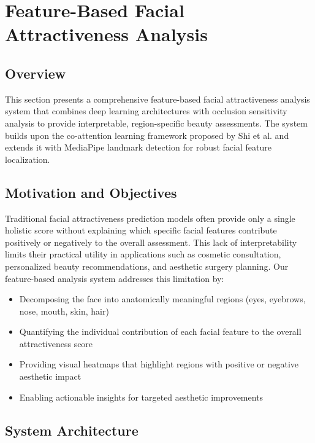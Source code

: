 \section{Feature-Based Facial Attractiveness Analysis}

\subsection{Overview}

This section presents a comprehensive feature-based facial attractiveness analysis system that combines deep learning architectures with occlusion sensitivity analysis to provide interpretable, region-specific beauty assessments. The system builds upon the co-attention learning framework proposed by Shi et al. \cite{shi2019improving} and extends it with MediaPipe landmark detection for robust facial feature localization.

\subsection{Motivation and Objectives}

Traditional facial attractiveness prediction models often provide only a single holistic score without explaining which specific facial features contribute positively or negatively to the overall assessment. This lack of interpretability limits their practical utility in applications such as cosmetic consultation, personalized beauty recommendations, and aesthetic surgery planning. Our feature-based analysis system addresses this limitation by:

\begin{itemize}
    \item Decomposing the face into anatomically meaningful regions (eyes, eyebrows, nose, mouth, skin, hair)
    \item Quantifying the individual contribution of each facial feature to the overall attractiveness score
    \item Providing visual heatmaps that highlight regions with positive or negative aesthetic impact
    \item Enabling actionable insights for targeted aesthetic improvements
\end{itemize}

\subsection{System Architecture}

